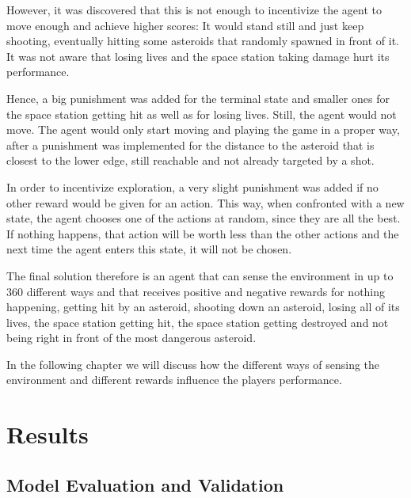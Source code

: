 \documentclass[a4paper,10pt]{article}
\begin{document}
However, it was discovered that this is not enough to incentivize the agent to move enough and achieve higher scores: It would stand still and just keep shooting, eventually hitting some asteroids that randomly spawned in front of it.
It was not aware that losing lives and the space station taking damage hurt its performance.

Hence, a big punishment was added for the terminal state and smaller ones for the space station getting hit as well as for losing lives.
Still, the agent would not move.
The agent would only start moving and playing the game in a proper way, after a punishment was implemented for the distance to the asteroid that is closest to the lower edge, still reachable and not already targeted by a shot.

In order to incentivize exploration, a very slight punishment was added if no other reward would be given for an action.
This way, when confronted with a new state, the agent chooses one of the actions at random, since they are all the best.
If nothing happens, that action will be worth less than the other actions and the next time the agent enters this state, it will not be chosen.

The final solution therefore is an agent that can sense the environment in up to $360$ different ways and that receives positive and negative rewards for nothing happening, getting hit by an asteroid, shooting down an asteroid, losing all of its lives, the space station getting hit, the space station getting destroyed and not being right in front of the most dangerous asteroid.

In the following chapter we will discuss how the different ways of sensing the environment and different rewards influence the players performance.
\section{Results}

\subsection{Model Evaluation and Validation}
\end{document}
